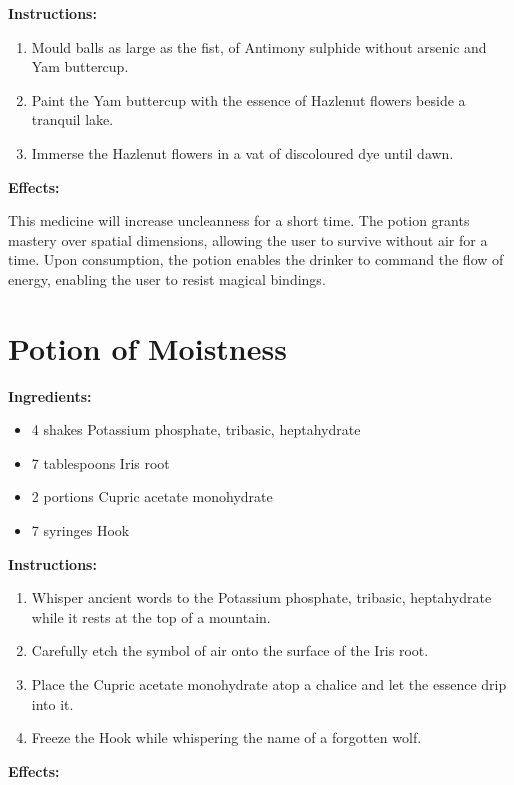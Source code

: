 \documentclass{article}
\begin{document}
\textbf{Instructions:}

\begin{enumerate}
  \item Mould balls as large as the fist, of Antimony sulphide without arsenic and Yam buttercup.
  \item Paint the Yam buttercup with the essence of Hazlenut flowers beside a tranquil lake.
  \item Immerse the Hazlenut flowers in a vat of discoloured dye until dawn.
\end{enumerate}

\textbf{Effects:}

This medicine will increase uncleanness for a short time. The potion grants mastery over spatial dimensions, allowing the user to survive without air for a time. Upon consumption, the potion enables the drinker to command the flow of energy, enabling the user to resist magical bindings.

\newpage
\section*{Potion of Moistness}

\textbf{Ingredients:}

\begin{itemize}
  \item 4 shakes Potassium phosphate, tribasic, heptahydrate
  \item 7 tablespoons Iris root
  \item 2 portions Cupric acetate monohydrate
  \item 7 syringes Hook
\end{itemize}

\textbf{Instructions:}

\begin{enumerate}
  \item Whisper ancient words to the Potassium phosphate, tribasic, heptahydrate while it rests at the top of a mountain.
  \item Carefully etch the symbol of air onto the surface of the Iris root.
  \item Place the Cupric acetate monohydrate atop a chalice and let the essence drip into it.
  \item Freeze the Hook while whispering the name of a forgotten wolf.
\end{enumerate}

\textbf{Effects:}
\end{document}
